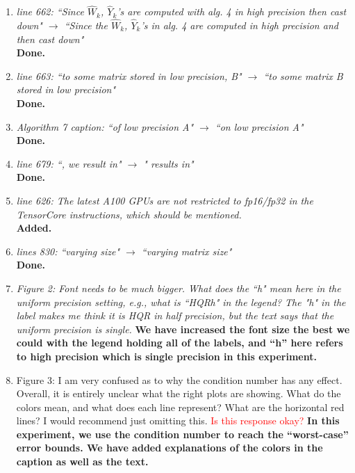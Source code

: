 \documentclass[final,onefignum,onetabnum]{siamart190516}
\newcommand{\red}[1]{\textcolor{red}{#1}}
\begin{document}
\begin{enumerate}
	\item {\it line 662: ``Since $\hat{W}_k$, $\hat{Y}_k$'s are computed with alg. 4 in high precision then cast down" $\rightarrow$ ``Since the $\hat{W}_k$, $\hat{Y}_k$'s in alg. 4 are computed in high precision and then cast down"}\\
	{\bf Done.}
	
	\item {\it line 663: ``to some matrix stored in low precision, B" $\rightarrow$ ``to some matrix B stored in low precision"}\\
	{\bf Done.}
	
	\item {\it Algorithm 7 caption: ``of low precision A" $\rightarrow$ ``on low precision A"}\\
	{\bf Done.}
	
	\item {\it line 679: ``, we result in" $\rightarrow$ " results in"}\\
	{\bf Done.}
	
	\item {\it line 626: The latest A100 GPUs are not restricted to fp16/fp32 in the TensorCore instructions, which should be mentioned.} \\
	{\bf Added.}
	
	\item {\it lines 830: ``varying size" $\rightarrow$ ``varying matrix size"}\\
	{\bf Done.}
	
	\item {\it Figure 2: Font needs to be much bigger. What does the ``h" mean here in the uniform precision setting, e.g., what is ``HQRh" in the legend? The "h" in the label makes me think it is HQR in half precision, but the text says that the uniform precision is single. }
	{\bf We have increased the font size the best we could with the legend holding all of the labels, and ``h'' here refers to high precision which is single precision in this experiment.}
	
	\item Figure 3: I am very confused as to why the condition number has any effect. Overall, it is entirely unclear what the right plots are showing. What do the colors mean, and what does each line represent? What are the horizontal red lines? I would recommend just omitting this. 
	\red{Is this response okay?}
	{\bf In this experiment, we use the condition number to reach the ``worst-case'' error bounds. We have added explanations of the colors in the caption as well as the text. }
	
\end{enumerate}
\end{document}
